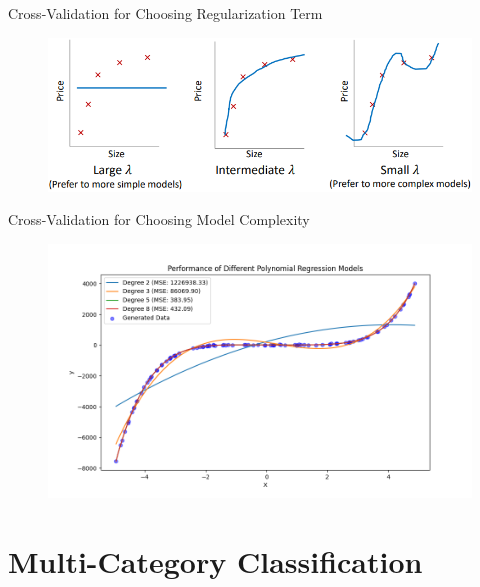 \documentclass[serif, aspectratio=169]{beamer}
\begin{document}
\begin{frame}{Cross-Validation for Choosing Regularization Term}
    \begin{figure}
        \centering
        \includegraphics[width=0.8\linewidth]{pic/Figure_29.png}
    \end{figure}
    \vfill
\end{frame}

\begin{frame}{Cross-Validation for Choosing Model Complexity}
    \begin{figure}
        \centering
        \includegraphics[width=0.8\linewidth]{pic/Figure_16.png}
    \end{figure}
\end{frame}

\section{Multi-Category Classification}
\end{document}
